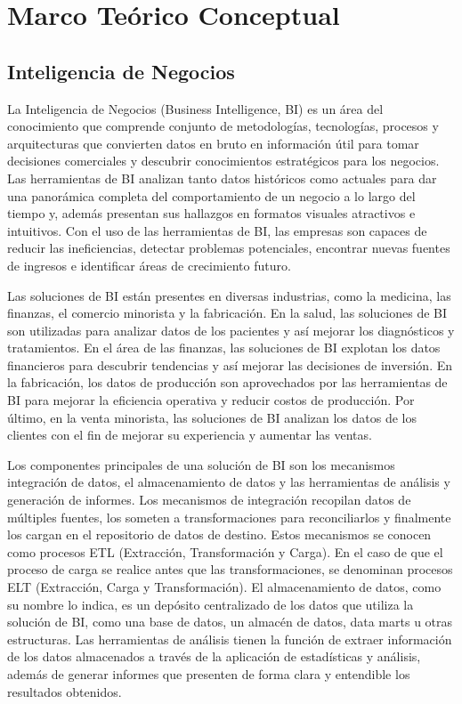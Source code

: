 \chapter{Marco Te\'orico Conceptual}\label{chapter:teoricframe}




\section{Inteligencia de Negocios}\label{section:bi}

La Inteligencia de Negocios (Business Intelligence, BI) es un \'area del conocimiento que comprende conjunto de metodologías, 
tecnologías, procesos y arquitecturas que convierten datos 
en bruto en información útil para tomar decisiones comerciales y descubrir conocimientos estratégicos para los negocios. 
Las herramientas de BI analizan tanto datos históricos como actuales para dar una panor\'amica completa del comportamiento 
de un negocio a lo largo del tiempo y, adem\'as presentan sus hallazgos en formatos visuales atractivos e intuitivos. 
Con el uso de las herramientas de BI, las empresas son capaces de reducir las ineficiencias, detectar problemas potenciales, 
encontrar nuevas fuentes de ingresos e identificar áreas de crecimiento futuro.

Las soluciones de BI est\'an presentes en diversas industrias, como la medicina, las finanzas, el comercio minorista y la 
fabricación. En la salud, las soluciones de BI son utilizadas para analizar datos de los pacientes y as\'i mejorar los
diagn\'osticos y tratamientos. En el \'area de las finanzas, las soluciones de BI explotan los datos financieros para 
descubrir tendencias y as\'i mejorar las decisiones de inversi\'on. En la fabricación, los datos de producción son aprovechados 
por las herramientas de BI para mejorar la eficiencia operativa y reducir costos de producción. Por \'ultimo, en la 
venta minorista, las soluciones de BI analizan los datos de los clientes con el fin de mejorar su experiencia y 
aumentar las ventas.

Los componentes principales de una solución de BI son los mecanismos integración de datos, el almacenamiento de datos y 
las herramientas de análisis y generaci\'on de informes\cite{lloyd2011identifying}. Los mecanismos de integración recopilan datos de múltiples fuentes, 
los someten a transformaciones para reconciliarlos y finalmente los cargan en el repositorio de datos de destino. Estos mecanismos se 
conocen como procesos ETL (Extracción, Transformación y Carga). En el caso de que el proceso de carga se realice antes que las transformaciones, 
se denominan procesos ELT (Extracción, Carga y Transformación). 
El almacenamiento de datos, como su nombre lo indica, es un depósito centralizado de los datos que utiliza la solución
de BI, como una base de datos, un almac\'en de datos, data marts u otras estructuras. Las herramientas de análisis tienen la función de extraer 
información de los datos almacenados a través de la aplicación de estadísticas y análisis, adem\'as de generar 
informes que presenten de forma clara y entendible los resultados obtenidos.

